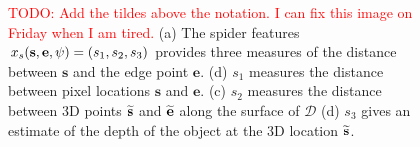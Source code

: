 \documentclass[10pt,twocolumn,letterpaper]{article}
\newcommand{\rgbdimage}{\mathcal{D}}
\newcommand{\pixelidx}{\mathbf{s}}
\newcommand{\edgeimidx}{\mathbf{e}}
\newcommand{\todo}[1]{\textcolor{red}{TODO: #1}}
\begin{document}
\begin{figure}[tb]
        \hfill
        \hfill
        \hfill
    \caption{
    \todo{Add the tildes above the notation. I can fix this image on Friday when I am tired.}
    (a) The spider features $\scalfeat_s(\pixelidx, \edgeimidx, \psi) = (s_1, s_2, s_3)$ provides three measures of the distance between $\pixelidx$ and the edge point $\edgeimidx$.
    (d) $s_1$ measures the distance between pixel locations $\pixelidx$ and $\edgeimidx$.
    (c) $s_2$ measures the distance between 3D points $\pointthreed$ and $\edgethreed$ along the surface of $\rgbdimage$
    (d) $s_3$ gives an estimate of the depth of the object at the 3D location $\pointthreed$.
    }%
    \label{fig:features}
\end{figure}
\end{document}
